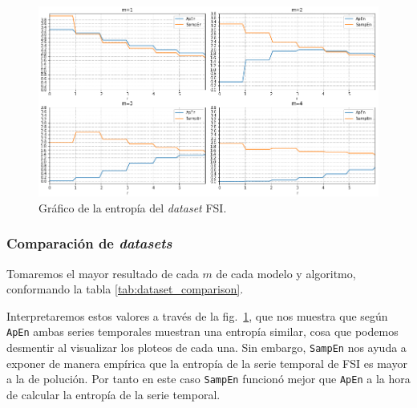 \documentclass[a4paper,12pt]{article}
\begin{document}
\begin{figure}[H]
	\begin{center}
	\includegraphics[width=1\textwidth]{en_fsi.png}
  	\caption{Gráfico de la entropía del \textit{dataset} FSI.}
  	\label{fig:en_fsi}
  	\end{center}
\end{figure}

\subsubsection{Comparación de \textit{datasets}}
Tomaremos el mayor resultado de cada $m$ de cada modelo y algoritmo, conformando la tabla \ref{tab:dataset_comparison}.

Interpretaremos estos valores a través de la fig.~\ref{fig:en_fsi}, que nos muestra que según \texttt{ApEn} ambas series temporales muestran una entropía similar, cosa que podemos desmentir al visualizar los ploteos de cada una. Sin embargo, \texttt{SampEn} nos ayuda a exponer de manera empírica que la entropía de la serie temporal de FSI es mayor a la de polución. Por tanto en este caso \texttt{SampEn} funcionó mejor que \texttt{ApEn} a la hora de calcular la entropía de la serie temporal.
\end{document}
